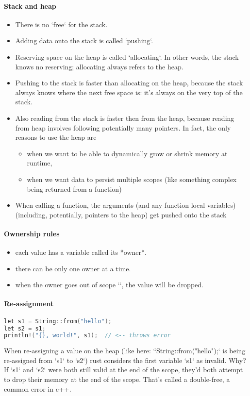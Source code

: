 \paragraph{Stack and heap}

\begin{itemize}
    \item There is no `free` for the stack.
    \item Adding data onto the stack is called `pushing`.
    \item Reserving space on the heap is called `allocating`. In other words, the stack knows no reserving; allocating always refers to the heap.
    \item Pushing to the stack is faster than allocating on the heap, because the stack always knows where the next free space is: it's always on the very top of the stack.
    \item Also reading from the stack is faster then from the heap, because reading from heap involves following potentially many pointers. In fact, the only reasons to use the heap are
    \begin{itemize}
        \item  when we want to be able to dynamically grow or shrink memory at runtime,
        \item  when we want data to persist multiple scopes (like something complex being returned from a function)
    \end{itemize}
    \item When calling a function, the arguments (and any function-local variables) (including, potentially, pointers to the heap) get pushed onto the stack
\end{itemize}

\paragraph{Ownership rules}
\begin{itemize}
    \item each value has a variable called its *owner*.
    \item there can be only one owner at a time.
    \item when the owner goes out of scope `{}`, the value will be dropped.
\end{itemize}

\paragraph{Re-assignment}
\begin{lstlisting}[language=c]
let s1 = String::from("hello");
let s2 = s1;
println!("{}, world!", s1);  // <-- throws error
\end{lstlisting}
When re-assigning a value on the heap (like here: ``String::from("hello");` is being re-assigned from `s1` to `s2`) rust considers the first variable `s1` as invalid. Why? If `s1` and `s2` were both still valid at the end of the scope, they'd both attempt to drop their memory at the end of the scope. That's called a double-free, a common error in c++.

